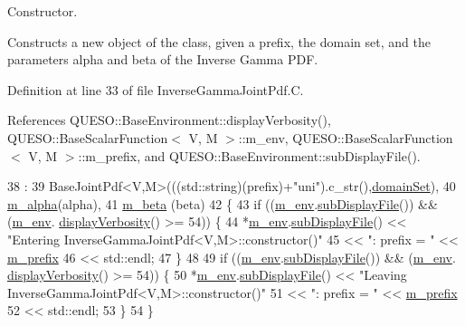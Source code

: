 Constructor. 

Constructs a new object of the class, given a prefix, the domain set, and the parameters {\ttfamily alpha} and {\ttfamily beta} of the Inverse Gamma P\-D\-F. 

Definition at line 33 of file Inverse\-Gamma\-Joint\-Pdf.\-C.



References Q\-U\-E\-S\-O\-::\-Base\-Environment\-::display\-Verbosity(), Q\-U\-E\-S\-O\-::\-Base\-Scalar\-Function$<$ V, M $>$\-::m\-\_\-env, Q\-U\-E\-S\-O\-::\-Base\-Scalar\-Function$<$ V, M $>$\-::m\-\_\-prefix, and Q\-U\-E\-S\-O\-::\-Base\-Environment\-::sub\-Display\-File().


\begin{DoxyCode}
38   :
39   BaseJointPdf<V,M>(((std::string)(prefix)+\textcolor{stringliteral}{"uni"}).c\_str(),\hyperlink{class_q_u_e_s_o_1_1_base_scalar_function_ad0937628825249dd36ded3ce0c7959ac}{domainSet}),
40   \hyperlink{class_q_u_e_s_o_1_1_inverse_gamma_joint_pdf_a37f266451b387acdbdd1197de3229662}{m\_alpha}(alpha),
41   \hyperlink{class_q_u_e_s_o_1_1_inverse_gamma_joint_pdf_a599b413c540f5b8bae0482ff626e3562}{m\_beta} (beta)
42 \{
43   \textcolor{keywordflow}{if} ((\hyperlink{class_q_u_e_s_o_1_1_base_scalar_function_adf44141aeb765d97613286f88f235f04}{m\_env}.\hyperlink{class_q_u_e_s_o_1_1_base_environment_a8a0064746ae8dddfece4229b9ad374d6}{subDisplayFile}()) && (\hyperlink{class_q_u_e_s_o_1_1_base_scalar_function_adf44141aeb765d97613286f88f235f04}{m\_env}.
      \hyperlink{class_q_u_e_s_o_1_1_base_environment_a1fe5f244fc0316a0ab3e37463f108b96}{displayVerbosity}() >= 54)) \{
44     *\hyperlink{class_q_u_e_s_o_1_1_base_scalar_function_adf44141aeb765d97613286f88f235f04}{m\_env}.\hyperlink{class_q_u_e_s_o_1_1_base_environment_a8a0064746ae8dddfece4229b9ad374d6}{subDisplayFile}() << \textcolor{stringliteral}{"Entering InverseGammaJointPdf<V,M>::constructor()"}
45                             << \textcolor{stringliteral}{": prefix = "} << \hyperlink{class_q_u_e_s_o_1_1_base_scalar_function_a6e81dc902aca6a546877da99b2f4a169}{m\_prefix}
46                             << std::endl;
47   \}
48 
49   \textcolor{keywordflow}{if} ((\hyperlink{class_q_u_e_s_o_1_1_base_scalar_function_adf44141aeb765d97613286f88f235f04}{m\_env}.\hyperlink{class_q_u_e_s_o_1_1_base_environment_a8a0064746ae8dddfece4229b9ad374d6}{subDisplayFile}()) && (\hyperlink{class_q_u_e_s_o_1_1_base_scalar_function_adf44141aeb765d97613286f88f235f04}{m\_env}.
      \hyperlink{class_q_u_e_s_o_1_1_base_environment_a1fe5f244fc0316a0ab3e37463f108b96}{displayVerbosity}() >= 54)) \{
50     *\hyperlink{class_q_u_e_s_o_1_1_base_scalar_function_adf44141aeb765d97613286f88f235f04}{m\_env}.\hyperlink{class_q_u_e_s_o_1_1_base_environment_a8a0064746ae8dddfece4229b9ad374d6}{subDisplayFile}() << \textcolor{stringliteral}{"Leaving InverseGammaJointPdf<V,M>::constructor()"}
51                             << \textcolor{stringliteral}{": prefix = "} << \hyperlink{class_q_u_e_s_o_1_1_base_scalar_function_a6e81dc902aca6a546877da99b2f4a169}{m\_prefix}
52                             << std::endl;
53   \}
54 \}
\end{DoxyCode}
